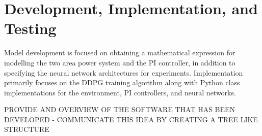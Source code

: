 \chapter{Development, Implementation, and Testing}
Model development is focused on obtaining a mathematical expression for modelling the two area power system and the PI controller, in addition to specifying the neural network architectures for experiments. Implementation primarily focuses on the DDPG training algorithm along with Python class implementations for the environment, PI controllers, and neural networks.

PROVIDE AND OVERVIEW OF THE SOFTWARE THAT HAS BEEN DEVELOPED - COMMUNICATE THIS IDEA BY CREATING A TREE LIKE STRUCTURE











